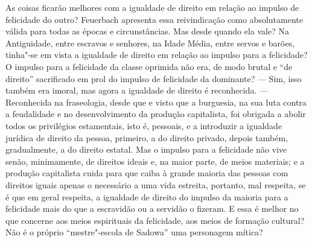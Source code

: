 As coisas ficarão melhores com a igualdade de direito em relação ao
impulso de felicidade do
outro? Feuerbach 
apresenta essa reivindicação como absolutamente válida para todas as
épocas e circunstâncias. Mas desde quando ela vale? Na Antiguidade,
entre escravos e senhores, na Idade Média, entre servos e barões,
tinha"-se em vista a igualdade de direito em relação ao impulso para a
felicidade? O impulso para a felicidade da classe oprimida não era, de
modo brutal e ``de direito'' sacrificado em prol do impulso de
felicidade da dominante? --- Sim, isso também era imoral, mas agora a
igualdade de direito é reconhecida. --- Reconhecida na fraseologia, desde
que e visto que a burguesia, na sua luta contra a feudalidade e no
desenvolvimento da produção capitalista, foi obrigada a abolir todos os
privilégios estamentais, isto é, pessoais, e a introduzir a igualdade
jurídica de direito da pessoa, primeiro, a do direito privado, depois
também, gradualmente, a do direito estatal. Mas o impulso para a
felicidade não vive senão, minimamente, de direitos ideais e, na maior
parte, de meios materiais; e a produção capitalista cuida para que caiba
à grande maioria das pessoas com direitos iguais apenas o necessário a
uma vida estreita, portanto, mal respeita, se é que em geral respeita, a
igualdade de direito do impulso da maioria para a felicidade mais do que
a escravidão ou a servidão o fizeram. E essa é melhor no que concerne
aos meios espirituais da felicidade, aos meios de formação cultural? Não
é o próprio ``mestre"-escola de Sadowa'' uma
personagem mítica?

